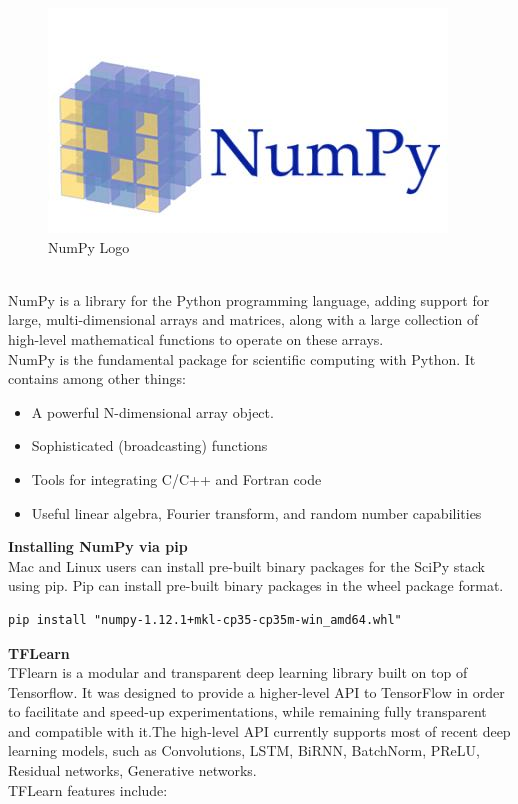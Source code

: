 \begin{figure}[h]
	\centering\includegraphics[scale=0.75]{images/numpy_logo.jpg}
	\caption{NumPy Logo}
\end{figure}\\NumPy is a library for the Python programming language, adding support for large, multi-dimensional arrays and matrices, along with a large collection of high-level mathematical functions to operate on these arrays.\\
NumPy is the fundamental package for scientific computing with Python. It contains among other things:
\begin{itemize}
	\item A powerful N-dimensional array object.
	\item Sophisticated (broadcasting) functions
	\item Tools for integrating C/C++ and Fortran code
	\item Useful linear algebra, Fourier transform, and random number capabilities
\end{itemize}
\textbf{Installing NumPy via pip}\\
Mac and Linux users can install pre-built binary packages for the SciPy stack using pip. Pip can install pre-built binary packages in the wheel package format.
\begin{lstlisting}
pip install "numpy-1.12.1+mkl-cp35-cp35m-win_amd64.whl"
\end{lstlisting}
\textbf{{\Large TFLearn}}\\TFlearn is a modular and transparent deep learning library built on top of Tensorflow. It was designed to provide a higher-level API to TensorFlow in order to facilitate and speed-up experimentations, while remaining fully transparent and compatible with it.The high-level API currently supports most of recent deep learning models, such as Convolutions, LSTM, BiRNN, BatchNorm, PReLU, Residual networks, Generative networks.\\TFLearn features include:
